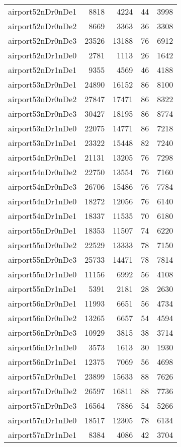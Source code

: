 \begin{longtable}{lrrrr}
airport52nDr0nDe1 & 8818 & 4224 & 44 & 3998 \\
airport52nDr0nDe2 & 8669 & 3363 & 36 & 3308 \\
airport52nDr0nDe3 & 23526 & 13188 & 76 & 6912 \\
airport52nDr1nDe0 & 2781 & 1113 & 26 & 1642 \\
airport52nDr1nDe1 & 9355 & 4569 & 46 & 4188 \\
airport53nDr0nDe1 & 24890 & 16152 & 86 & 8100 \\
airport53nDr0nDe2 & 27847 & 17471 & 86 & 8322 \\
airport53nDr0nDe3 & 30427 & 18195 & 86 & 8774 \\
airport53nDr1nDe0 & 22075 & 14771 & 86 & 7218 \\
airport53nDr1nDe1 & 23322 & 15448 & 82 & 7240 \\
airport54nDr0nDe1 & 21131 & 13205 & 76 & 7298 \\
airport54nDr0nDe2 & 22750 & 13554 & 76 & 7160 \\
airport54nDr0nDe3 & 26706 & 15486 & 76 & 7784 \\
airport54nDr1nDe0 & 18272 & 12056 & 76 & 6140 \\
airport54nDr1nDe1 & 18337 & 11535 & 70 & 6180 \\
airport55nDr0nDe1 & 18353 & 11507 & 74 & 6220 \\
airport55nDr0nDe2 & 22529 & 13333 & 78 & 7150 \\
airport55nDr0nDe3 & 25733 & 14471 & 78 & 7814 \\
airport55nDr1nDe0 & 11156 & 6992 & 56 & 4108 \\
airport55nDr1nDe1 & 5391 & 2181 & 28 & 2630 \\
airport56nDr0nDe1 & 11993 & 6651 & 56 & 4734 \\
airport56nDr0nDe2 & 13265 & 6657 & 54 & 4594 \\
airport56nDr0nDe3 & 10929 & 3815 & 38 & 3714 \\
airport56nDr1nDe0 & 3573 & 1613 & 30 & 1930 \\
airport56nDr1nDe1 & 12375 & 7069 & 56 & 4698 \\
airport57nDr0nDe1 & 23899 & 15633 & 88 & 7626 \\
airport57nDr0nDe2 & 26597 & 16811 & 88 & 7736 \\
airport57nDr0nDe3 & 16564 & 7886 & 54 & 5266 \\
airport57nDr1nDe0 & 18517 & 12305 & 78 & 6134 \\
airport57nDr1nDe1 & 8384 & 4086 & 42 & 3704 \\

\end{longtable}
